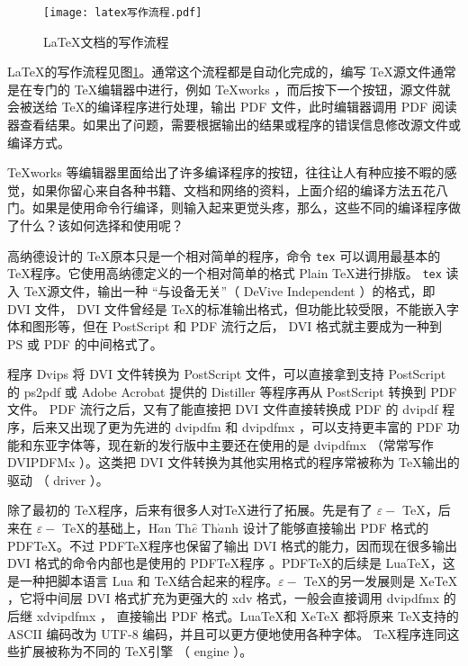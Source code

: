 \begin{figure}[H]
    \centering
    \texttt{[image: latex写作流程.pdf]}
    \caption{\LaTeX 文档的写作流程}
    \label{fig:5}
\end{figure}

\LaTeX 的写作流程见图\ref{fig:5}。通常这个流程都是自动化完成的，编写 \TeX 源文件通常是在专门的 \TeX 编辑器中进行，例如 TeXworks ，而后按下一个按钮，源文件就会被送给 \TeX 的编译程序进行处理，输出 PDF 文件，此时编辑器调用 PDF 阅读器查看结果。如果出了问题，需要根据输出的结果或程序的错误信息修改源文件或编译方式。

{
    \qquad TeXworks 等编辑器里面给出了许多编译程序的按钮，往往让人有种应接不暇的感觉，如果你留心来自各种书籍、文档和网络的资料，上面介绍的编译方法五花八门。如果是使用命令行编译，则输入起来更觉头疼，那么，这些不同的编译程序做了什么？该如何选择和使用呢？

    \qquad 高纳德设计的 \TeX 原本只是一个相对简单的程序，命令 \lstinline{tex} 可以调用最基本的 \TeX 程序。它使用高纳德定义的一个相对简单的格式 Plain \TeX 进行排版。 \lstinline{tex} 读入 \TeX 源文件，输出一种 “与设备无关”（  DeVive Independent ）的格式，即 DVI 文件， DVI 文件曾经是 \TeX 的标准输出格式，但功能比较受限，不能嵌入字体和图形等，但在 PostScript 和 PDF 流行之后， DVI 格式就主要成为一种到 PS 或 PDF 的中间格式了。

    \qquad 程序 Dvips 将 DVI 文件转换为 PostScript 文件，可以直接拿到支持 PostScript 的 ps2pdf 或 Adobe Acrobat 提供的 Distiller 等程序再从 PostScript 转换到 PDF 文件。 PDF 流行之后，又有了能直接把 DVI 文件直接转换成 PDF 的 dvipdf 程序，后来又出现了更为先进的 dvipdfm 和 dvipdfmx ，可以支持更丰富的 PDF 功能和东亚字体等，现在新的发行版中主要还在使用的是 dvipdfmx （常常写作 DVIPDFMx ）。这类把 DVI 文件转换为其他实用格式的程序常被称为 \TeX 输出的驱动 （ driver ）。

    \qquad 除了最初的 \TeX 程序，后来有很多人对\TeX 进行了拓展。先是有了 $\varepsilon-$ \TeX ，后来在 $\varepsilon-$ \TeX 的基础上，$\text{H}\grave{a}\text{n Th}\hat{e} \text{ Th}\grave{a}\text{nh} $ 设计了能够直接输出 PDF 格式的 PDF\TeX 。不过  PDF\TeX 程序也保留了输出 DVI 格式的能力，因而现在很多输出 DVI 格式的命令内部也是使用的 PDF\TeX 程序 。PDF\TeX 的后续是 Lua\TeX，这是一种把脚本语言 Lua 和 \TeX 结合起来的程序。$\varepsilon-$ \TeX 的另一发展则是 XeTeX ，它将中间层 DVI 格式扩充为更强大的 xdv 格式，一般会直接调用 dvipdfmx 的后继 xdvipdfmx ， 直接输出 PDF 格式。Lua\TeX 和 XeTeX 都将原来 \TeX 支持的 ASCII 编码改为 UTF-8 编码，并且可以更方便地使用各种字体。 \TeX 程序连同这些扩展被称为不同的 \TeX 引擎 （ engine ）。

}
